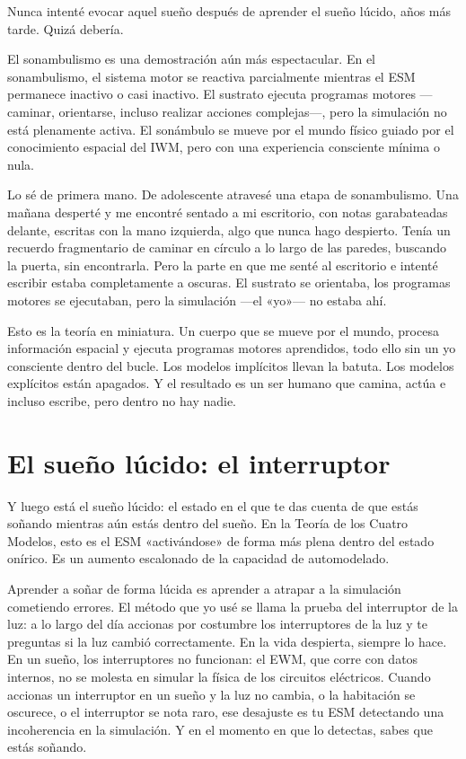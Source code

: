 \documentclass[11pt, twoside, openright]{book}
\begin{document}
Nunca intenté evocar aquel sueño después de aprender el sueño lúcido, años más tarde. Quizá debería.

El sonambulismo es una demostración aún más espectacular. En el sonambulismo, el sistema motor se reactiva parcialmente mientras el ESM permanece inactivo o casi inactivo. El sustrato ejecuta programas motores ---caminar, orientarse, incluso realizar acciones complejas---, pero la simulación no está plenamente activa. El sonámbulo se mueve por el mundo físico guiado por el conocimiento espacial del IWM, pero con una experiencia consciente mínima o nula.

Lo sé de primera mano. De adolescente atravesé una etapa de sonambulismo. Una mañana desperté y me encontré sentado a mi escritorio, con notas garabateadas delante, escritas con la mano izquierda, algo que nunca hago despierto. Tenía un recuerdo fragmentario de caminar en círculo a lo largo de las paredes, buscando la puerta, sin encontrarla. Pero la parte en que me senté al escritorio e intenté escribir estaba completamente a oscuras. El sustrato se orientaba, los programas motores se ejecutaban, pero la simulación ---el «yo»--- no estaba ahí.

Esto es la teoría en miniatura. Un cuerpo que se mueve por el mundo, procesa información espacial y ejecuta programas motores aprendidos, todo ello sin un yo consciente dentro del bucle. Los modelos implícitos llevan la batuta. Los modelos explícitos están apagados. Y el resultado es un ser humano que camina, actúa e incluso escribe, pero dentro no hay nadie.

\section*{El sueño lúcido: el interruptor}

Y luego está el sueño lúcido: el estado en el que te das cuenta de que estás soñando mientras aún estás dentro del sueño. En la Teoría de los Cuatro Modelos, esto es el ESM «activándose» de forma más plena dentro del estado onírico. Es un aumento escalonado de la capacidad de automodelado.

Aprender a soñar de forma lúcida es aprender a atrapar a la simulación cometiendo errores. El método que yo usé se llama la prueba del interruptor de la luz: a lo largo del día accionas por costumbre los interruptores de la luz y te preguntas si la luz cambió correctamente. En la vida despierta, siempre lo hace. En un sueño, los interruptores no funcionan: el EWM, que corre con datos internos, no se molesta en simular la física de los circuitos eléctricos. Cuando accionas un interruptor en un sueño y la luz no cambia, o la habitación se oscurece, o el interruptor se nota raro, ese desajuste es tu ESM detectando una incoherencia en la simulación. Y en el momento en que lo detectas, sabes que estás soñando.
\end{document}

